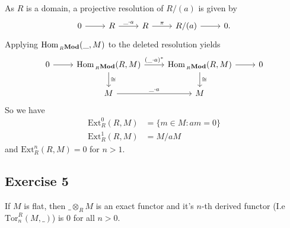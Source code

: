 \documentclass{article}
\theoremstyle{definition}
\newcommand{\Hom}{\text{Hom}}
\newcommand{\Tor}{\text{Tor}}
\newcommand{\Ext}{\text{Ext}}
\newcommand{\catname}[1]{{\normalfont\textbf{#1}}}
\newcommand{\RMod}{\,_{R}\catname{Mod}}
\begin{document}
As $R$ is a domain, a projective resolution of $R/(a)$ is given by
\[
\begin{tikzcd}
	0
	\ar{r}
	& R
	\ar{r}{\_ \cdot a}
	& R
	\ar{r}{\pi}
	& R/(a)
	\ar{r}
	& 0.
\end{tikzcd}
\]
Applying $\Hom_{\RMod}(\_, M)$ to the deleted resolution yields
\[
\begin{tikzcd}
	0
	\ar{r}
	& \Hom_{\RMod}(R, M)
	\ar{r}{(\_ \cdot a)^{*}}
	\ar{d}{\cong}
	& \Hom_{\RMod}(R, M)
	\ar{r}
	\ar{d}{\cong}
	& 0 \\
	& M
	\ar{r}{\_ \cdot a}
	& M
\end{tikzcd}
\]
So we have 
\begin{align*}
	\Ext_{R}^{0}(R, M)
	&=
	\{m \in M : am = 0\} \\
	\Ext_{R}^{1}(R, M)
	&=
	M / aM	
\end{align*}
and $\Ext_{R}^{n}(R, M) = 0$ for $n > 1$.


\subsection*{Exercise 5}

If $M$ is flat, then $\_ \otimes_{R} M$ is an exact functor and it's $n$-th
derived functor (I.e $\Tor_{n}^{R}(M, \_)$) is $0$ for all $n > 0$. \\
\end{document}
